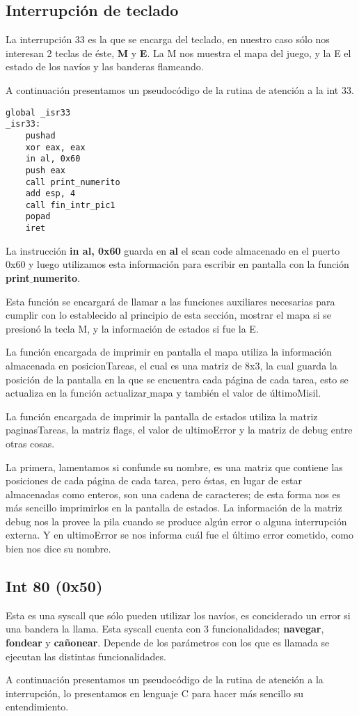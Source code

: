 \subsection{Interrupción de teclado}
\par{La interrupción 33 es la que se encarga del teclado, en nuestro caso sólo nos interesan 2 teclas de éste, \textbf{M} y \textbf{E}. La M nos muestra el mapa del juego, y la E el estado de los navíos y las banderas flameando.}
\par{A continuación presentamos un pseudocódigo de la rutina de atención a la int 33.}
\begin{lstlisting}[language={[x86masm]Assembler}]
global _isr33
_isr33:
    pushad
    xor eax, eax
    in al, 0x60
    push eax
    call print_numerito
    add esp, 4
    call fin_intr_pic1
    popad
    iret
\end{lstlisting}
\par{La instrucción \textbf{in al, 0x60} guarda en \textbf{al} el scan code almacenado en el puerto 0x60 y luego utilizamos esta información para escribir en pantalla con la función \textbf{print$\_$numerito}.}
\par{Esta función se encargará de llamar a las funciones auxiliares necesarias para cumplir con lo establecido al principio de esta sección, mostrar el mapa si se presionó la tecla M, y la información de estados si fue la E.}
\par{La función encargada de imprimir en pantalla el mapa utiliza la información almacenada en posicionTareas, el cual es una matriz de 8x3, la cual guarda la posición de la pantalla en la que se encuentra cada página de cada tarea, esto se actualiza en la función actualizar$\_$mapa y también el valor de últimoMisil.}
\par{ La función encargada de imprimir la pantalla de estados utiliza la matriz paginasTareas, la matriz flags, el valor de ultimoError y la matriz de debug entre otras cosas.}
\par{ La primera, lamentamos si confunde su nombre, es una matriz que contiene las posiciones de cada página de cada tarea, pero éstas, en lugar de estar almacenadas como enteros, son una cadena de caracteres; de esta forma nos es más sencillo imprimirlos en la pantalla de estados. La información de la matriz debug nos la provee la pila cuando se produce algún error o alguna interrupción externa. Y en ultimoError se nos informa cuál fue el último error cometido, como bien nos dice su nombre.}
\subsection{Int 80 (0x50)}
\par{Esta es una syscall que sólo pueden utilizar los navíos, es conciderado un error si una bandera la llama. Esta syscall cuenta con 3 funcionalidades; \textbf{navegar}, \textbf{fondear} y \textbf{cañonear}. Depende de los parámetros con los que es llamada se ejecutan las distintas funcionalidades.}
\par{A continuación presentamos un pseudocódigo de la rutina de atención a la interrupción, lo presentamos en lenguaje C para hacer más sencillo su entendimiento.}

